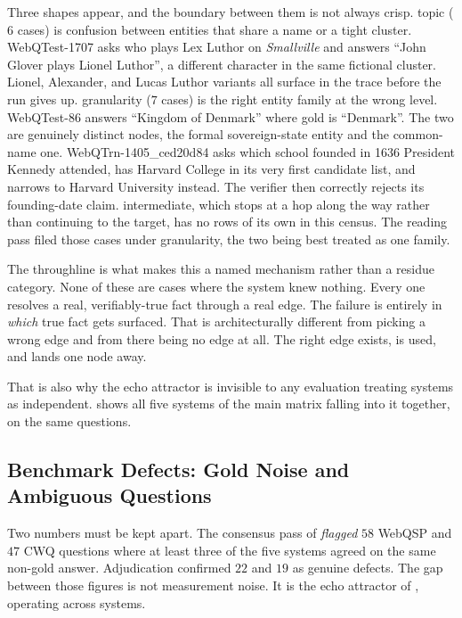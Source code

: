 Three shapes appear, and the boundary between them is not always crisp.
\textsf{topic} ($6$ cases) is confusion between entities that share a name or a
tight cluster. \textsf{WebQTest-1707} asks who plays Lex Luthor on
\emph{Smallville} and answers ``John Glover plays Lionel Luthor'', a different
character in the same fictional cluster. Lionel, Alexander, and Lucas Luthor
variants all surface in the trace before the run gives up. \textsf{granularity}
($7$ cases) is the right entity family at the wrong level. \textsf{WebQTest-86}
answers ``Kingdom of Denmark'' where gold is ``Denmark''. The two are genuinely
distinct nodes, the formal sovereign-state entity and the common-name one.
\textsf{WebQTrn-1405\_ced20d84} asks which school founded in 1636 President
Kennedy attended, has \textsf{Harvard College} in its very first candidate list,
and narrows to \textsf{Harvard University} instead. The verifier then correctly
rejects its founding-date claim. \textsf{intermediate}, which stops at a hop
along the way rather than continuing to the target, has no rows of its own in
this census. The reading pass filed those cases under \textsf{granularity}, the
two being best treated as one family.

The throughline is what makes this a named mechanism rather than a residue
category. None of these are cases where the system knew nothing. Every one
resolves a real, verifiably-true fact through a real edge. The failure is
entirely in \emph{which} true fact gets surfaced. That is architecturally
different from picking a wrong edge and from there being no edge at all. The
right edge exists, is used, and lands one node away.

That is also why the echo attractor is invisible to any evaluation treating
systems as independent.  shows all five systems of
the main matrix falling into it together, on the same questions.

\subsection{Benchmark Defects: Gold Noise and Ambiguous
Questions}\label{sec:benchmark-defects}

Two numbers must be kept apart. The consensus pass of
 \emph{flagged}
$58$ WebQSP and $47$ CWQ questions where at least three of the five systems
agreed on the same non-gold answer. Adjudication confirmed $22$ and $19$ as
genuine defects. The gap between those figures is not measurement noise. It is
the echo attractor of , operating across systems.

